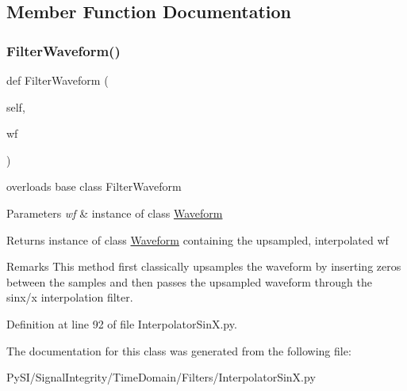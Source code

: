 \subsection{Member Function Documentation}
\mbox{\label{classSignalIntegrity_1_1TimeDomain_1_1Filters_1_1InterpolatorSinX_1_1InterpolatorSinX_a84e73c18250ca4a61482f94ad61e735b}} 
\subsubsection{\texorpdfstring{Filter\+Waveform()}{FilterWaveform()}}
{\footnotesize\ttfamily def Filter\+Waveform (\begin{DoxyParamCaption}\item[{}]{self,  }\item[{}]{wf }\end{DoxyParamCaption})}



overloads base class Filter\+Waveform 


\begin{DoxyParams}{Parameters}
{\em wf} & instance of class \hyperlink{namespaceSignalIntegrity_1_1TimeDomain_1_1Waveform}{Waveform} \\
\hline
\end{DoxyParams}
\begin{DoxyReturn}{Returns}
instance of class \hyperlink{namespaceSignalIntegrity_1_1TimeDomain_1_1Waveform}{Waveform} containing the upsampled, interpolated wf 
\end{DoxyReturn}
\begin{DoxyRemark}{Remarks}
This method first classically upsamples the waveform by inserting zeros between the samples and then passes the upsampled waveform through the sinx/x interpolation filter. 
\end{DoxyRemark}


Definition at line 92 of file Interpolator\+Sin\+X.\+py.



The documentation for this class was generated from the following file\+:\begin{DoxyCompactItemize}
\item 
Py\+S\+I/\+Signal\+Integrity/\+Time\+Domain/\+Filters/Interpolator\+Sin\+X.\+py\end{DoxyCompactItemize}
